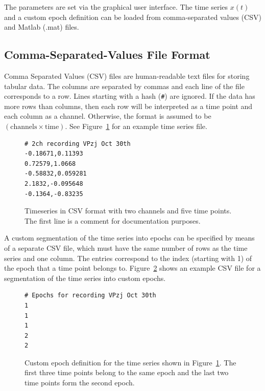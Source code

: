 \documentclass{article}
\newcommand{\1}{\ensuremath{\mathds{1}}}
\newcommand{\0}{\ensuremath{0}}
\begin{document}
The parameters are set via the graphical user interface. The time series 
$x(t)$ and a custom epoch definition can be loaded from comma-separated values
(CSV) and Matlab (.mat) files.

\subsection{Comma-Separated-Values File Format}
\label{sec:csv_input}

Comma Separated Values (CSV) files are human-readable text files for storing tabular data. 
The columns are separated by commas and each line of the file corresponds to a row. 
Lines starting with a hash (\texttt{\#}) are ignored. If the data has more rows than columns,
then each row will be interpreted as a time point and each column as a channel. Otherwise,
the format is assumed to be $(\text{channels} \times \text{time})$. See 
Figure~\ref{fig:ex_timeseries} for an example time series file. 

\begin{figure}[h]
\centering
\begin{boxedminipage}{10cm}
\begin{verbatim}
# 2ch recording VPzj Oct 30th
-0.18671,0.11393
0.72579,1.0668
-0.58832,0.059281
2.1832,-0.095648
-0.1364,-0.83235
\end{verbatim}
\end{boxedminipage}
\caption{
Timeseries in CSV format with two channels and five time points. 
The first line is a comment for documentation purposes.
\label{fig:ex_timeseries}
}
\end{figure}

A custom segmentation of the time series into epochs can be specified by means of 
a separate CSV file, which must have the same number of rows as the time series 
and one column. The entries correspond to the index (starting with 1) of the 
epoch that a time point belongs to. Figure~\ref{fig:ex_segmentation} shows 
an example CSV file for a segmentation of the time series into custom epochs. 

\begin{figure}[h]
\centering
\begin{boxedminipage}{10cm}
\begin{verbatim}
# Epochs for recording VPzj Oct 30th
1
1
1
2
2
\end{verbatim}
\end{boxedminipage}
\caption{
Custom epoch definition for the time series shown in Figure~\ref{fig:ex_timeseries}. 
The first three time points belong to the same epoch and the last two time points form the
second epoch.
\label{fig:ex_segmentation}
}
\end{figure}
\end{document}
